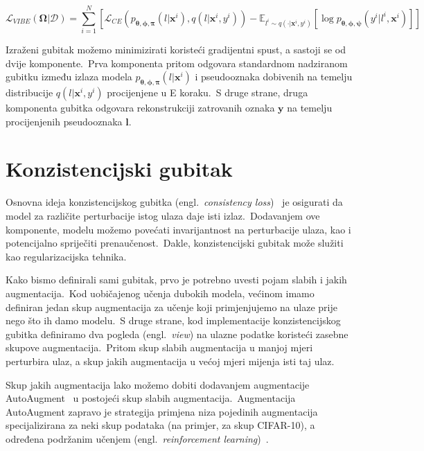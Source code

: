 \documentclass[diplomskirad]{fer}
\begin{document}
\begin{equation}
  \mathcal{L}_{VIBE}(\bm{\Omega} | \mathcal{D}) = \sum_{i=1}^{N} \left[ \mathcal{L}_{CE} (p_{\bm{\theta}, \bm{\phi}, \bm{\pi}}(l | \bm{x}^i), q(l | \bm{x}^i, y^i)) - \mathbb{E}_{l^i \sim q(\cdot | \bm{x}^i, y^i)} \left[ \log p_{\bm{\theta}, \bm{\phi}, \bm{\psi}}(y^i | l^i, \bm{x}^i) \right] \right]
  \label{eq:vibe_m_step_final}
\end{equation}

Izraženi gubitak možemo minimizirati koristeći gradijentni spust, a sastoji se od dvije komponente.\ 
Prva komponenta pritom odgovara standardnom nadziranom gubitku između izlaza modela $p_{\bm{\theta}, \bm{\phi}, \bm{\pi}}(l | \bm{x}^i)$ i pseudooznaka dobivenih na temelju distribucije $q(l | \bm{x}^i, y^i)$ procijenjene u E koraku.\ 
S druge strane, druga komponenta gubitka odgovara rekonstrukciji zatrovanih oznaka $\bm{y}$ na temelju procijenjenih pseudooznaka $\bm{l}$.\ 

\section{Konzistencijski gubitak}
\label{sek:kon_gubitak}

Osnovna ideja konzistencijskog gubitka (engl.\ \textit{consistency loss})~\cite{berthelot2019mixmatch} je osigurati da model za različite perturbacije istog ulaza daje isti izlaz.\ 
Dodavanjem ove komponente, modelu možemo povećati invarijantnost na perturbacije ulaza, kao i potencijalno spriječiti prenaučenost.\ 
Dakle, konzistencijski gubitak može služiti kao regularizacijska tehnika.\ 

Kako bismo definirali sami gubitak, prvo je potrebno uvesti pojam slabih i jakih augmentacija.\ 
Kod uobičajenog učenja dubokih modela, većinom imamo definiran jedan skup augmentacija za učenje koji primjenjujemo na ulaze prije nego što ih damo modelu.\ 
S druge strane, kod implementacije konzistencijskog gubitka definiramo dva pogleda (engl.\ \textit{view}) na ulazne podatke koristeći zasebne skupove augmentacija.\ 
Pritom skup slabih augmentacija u manjoj mjeri perturbira ulaz, a skup jakih augmentacija u većoj mjeri mijenja isti taj ulaz.\ 

Skup jakih augmentacija lako možemo dobiti dodavanjem augmentacije AutoAugment~\cite{cubuk2019autoaugment} u postojeći skup slabih augmentacija.\
Augmentacija AutoAugment zapravo je strategija primjena niza pojedinih augmentacija specijalizirana za neki skup podataka (na primjer, za skup CIFAR-10), a određena podržanim učenjem (engl.\ \textit{reinforcement learning})~\cite{kaelbling1996reinforcement}.\ 
\end{document}
